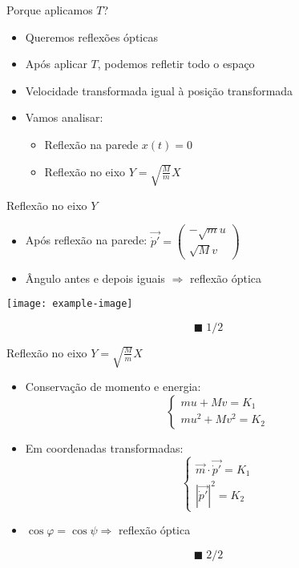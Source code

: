 \documentclass{beamer}
\begin{document}
\begin{frame}{Porque aplicamos $T$?}
\begin{itemize}
  \item Queremos reflexões ópticas
  \item Após aplicar $T$, podemos refletir todo o espaço
  \item Velocidade transformada igual à posição transformada
  \item Vamos analisar:
    \begin{itemize}
      \item Reflexão na parede $x(t) = 0$
      \item Reflexão no eixo $Y = \sqrt{\frac{M}{m}}X$
    \end{itemize}
\end{itemize}
\end{frame}

\begin{frame}{Reflexão no eixo $Y$}
\begin{itemize}
  \item Após reflexão na parede: $\vec{\dot p'} = \begin{pmatrix} -\sqrt{m}u \\ \sqrt{M}v \end{pmatrix}$
  \item Ângulo antes e depois iguais $\Rightarrow$ reflexão óptica
\end{itemize}

\texttt{[image: example-image]}

\[
\blacksquare \; 1/2
\]
\end{frame}

\begin{frame}{Reflexão no eixo $Y = \sqrt{\frac{M}{m}}X$}
\begin{itemize}
  \item Conservação de momento e energia:
  \[
  \begin{cases}
  mu + Mv = K_1 \\
  mu^2 + Mv^2 = K_2
  \end{cases}
  \]
  \item Em coordenadas transformadas:
  \[
  \begin{cases}
  \vec{m} \cdot \vec{\dot p'} = K_1 \\
  |\vec{\dot p'}|^2 = K_2
  \end{cases}
  \]
  \item $\cos \varphi = \cos \psi \Rightarrow$ reflexão óptica
\end{itemize}

\[
\blacksquare \; 2/2
\]
\end{frame}
\end{document}
